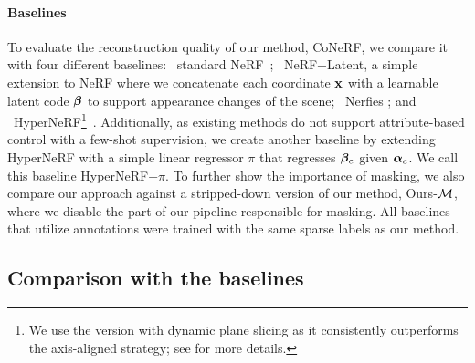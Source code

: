     \paragraph{Baselines}
      To evaluate the reconstruction quality of our method, CoNeRF, we compare
      it with four different baselines: ~standard
      NeRF~\cite{mildenhall2020nerf}; ~NeRF+Latent, a simple
      extension to NeRF where we concatenate each coordinate ${\mathbf{x}}$ with a
      learnable latent code ${\boldsymbol{\beta}}$ to support appearance changes of the
      scene; ~Nerfies \cite{park2020deformable}; and
      ~HyperNeRF\footnote{We use the version with dynamic plane
      slicing as it consistently outperforms the axis-aligned strategy; see
      \cite{park2021hypernerf} for more details.
      }~\cite{park2021hypernerf}.
      Additionally, as existing methods do not support attribute-based control
      with a few-shot supervision, we create another baseline  by
      extending HyperNeRF with a simple linear regressor $\pi$ that regresses
      ${\boldsymbol{\beta}}_c$ given ${\boldsymbol{\alpha}}_c$.
      We call this baseline HyperNeRF{+}$\pi$.
      To further show the importance of masking, we also compare our approach
      against a stripped-down version of our method, Ours{-}$\mathcal{M} $, where
      we disable the part of our pipeline responsible for masking.
      All baselines that utilize annotations were trained with the same sparse
      labels as our method.

  \subsection{Comparison with the baselines}
    

